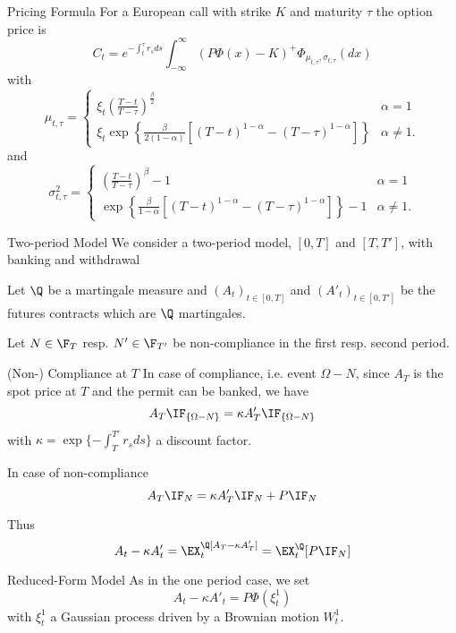 Pricing Formula
For a European call with strike $K$ and maturity $\tau$ the option price is
		$$
		C_t = e^{-\int_t^\tau r_s ds} \int_{-\infty}^\infty (P\Phi(x)-K)^+ \Phi_{\mu_{t,\tau}, \sigma_{t,\tau}}(dx)
		$$
	with
		$$
		\mu_{t,\tau}=
		\left\{
		\begin{array}{ll}
		\xi_t \left(\frac{T-t}{T-\tau}\right)^{\frac{\beta}{2}} & \alpha =1\\
		\xi_t \exp\left\{\frac{\beta}{2(1-\alpha)}[(T-t)^{1-\alpha}-(T-\tau)^{1-\alpha}]\right\} & \alpha \not= 1.
		\end{array}
		\right.
		$$
	and
		$$
		\sigma^2_{t,\tau}=
		\left\{
		\begin{array}{ll}
		\left(\frac{T-t}{T-\tau}\right)^\beta-1 & \alpha =1\\
		\exp\left\{\frac{\beta}{1-\alpha}[(T-t)^{1-\alpha}-(T-\tau)^{1-\alpha}]\right\}-1 & \alpha \not= 1.
		\end{array}
		\right.
		$$



Two-period Model
	We consider a two-period model, $[0,T]$ and $[T,T']$, with banking and withdrawal
	
	Let $\Q$ be a martingale measure and $(A_t)_{t\in[0,T]}$ and $(A'_t)_{t\in[0,T']}$
	be the futures contracts which are $\Q$ martingales.
	
	Let $N\in \F_T$ resp. $N' \in \F_{T'}$ be non-compliance in the first resp. second period.


(Non-) Compliance at $T$
	In case of compliance, i.e. event $\Omega-N$, since $A_T$ is the spot price at $T$ and the permit can be banked,  we have
		$$
		A_T\IF_{\{\Omega-N\}}= \kappa A'_T \IF_{\{\Omega-N\}}
		$$
	with $\kappa= \exp\{-\int_T^{T'}r_s ds\}$ a discount factor.
 
	In case of non-compliance
		$$
		A_T\IF_{N}= \kappa A'_T \IF_{N} + P\IF_N
		$$
	
	Thus
		$$
		A_t-\kappa A'_t = \EX_t^\Q[A_T-\kappa A'_T]= \EX^\Q_t[P \IF_N]
		$$



Reduced-Form Model
	As in the one period case,  we set
		$$
		A_t-\kappa A'_t = P \Phi(\xi_t^1)
		$$
	with $\xi^1_t$ a Gaussian process driven by a Brownian motion $W^1_t$.
	
